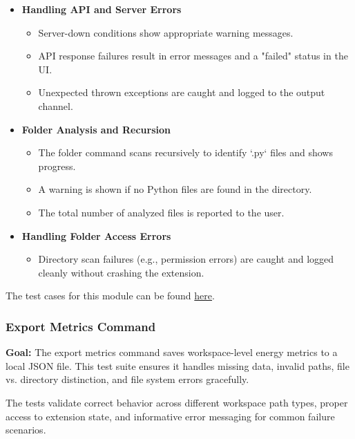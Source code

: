 \documentclass[12pt, titlepage]{article}
\begin{document}
\begin{itemize}
  \item \textbf{Handling API and Server Errors}
    \begin{itemize}
      \item Server-down conditions show appropriate warning messages.
      \item API response failures result in error messages and a "failed" status in the UI.
      \item Unexpected thrown exceptions are caught and logged to the output channel.
    \end{itemize}

  \item \textbf{Folder Analysis and Recursion}
    \begin{itemize}
      \item The folder command scans recursively to identify `.py` files and shows progress.
      \item A warning is shown if no Python files are found in the directory.
      \item The total number of analyzed files is reported to the user.
    \end{itemize}

  \item \textbf{Handling Folder Access Errors}
    \begin{itemize}
      \item Directory scan failures (e.g., permission errors) are caught and logged cleanly without crashing the extension.
    \end{itemize}
\end{itemize}

\noindent The test cases for this module can be found
\href{https://github.com/ssm-lab/capstone--sco-vs-code-plugin/blob/plugin-multi-file/test/detection.test.ts}{here}.

\subsubsection{Export Metrics Command}

\textbf{Goal:} The export metrics command saves workspace-level energy metrics to a local JSON file. This test suite ensures it handles missing data, invalid paths, file vs. directory distinction, and file system errors gracefully.

\medskip

\noindent The tests validate correct behavior across different workspace path types, proper access to extension state, and informative error messaging for common failure scenarios.
\end{document}
